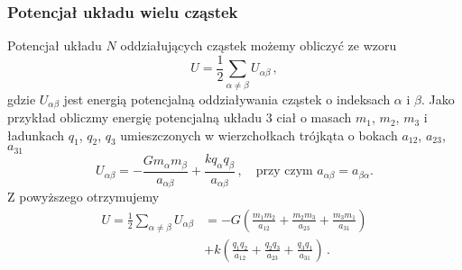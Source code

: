 \documentclass[../main.tex]{subfiles}
\begin{document}
\subsubsection{Potencjał układu wielu cząstek}
Potencjał układu \(N\) oddziałujących cząstek możemy obliczyć ze wzoru
\begin{equation*}
    U=\frac{1}{2}\sum_{\alpha\neq\beta}U_{\alpha\beta}\,,
\end{equation*}
gdzie \(U_{\alpha\beta}\) jest energią potencjalną oddziaływania cząstek o indeksach \(\alpha\) i
\(\beta\). Jako przykład obliczmy energię potencjalną układu 3 ciał o masach \(m_1\), \(m_2\),
\(m_3\) i ładunkach \(q_1\), \(q_2\), \(q_3\) umieszczonych w wierzchołkach trójkąta o bokach
\(a_{12}\), \(a_{23}\), \(a_{31}\)
\begin{equation*}
    U_{\alpha\beta}=-\frac{Gm_\alpha m_\beta}{a_{\alpha\beta}}+\frac{kq_\alpha q_\beta}{a_{\alpha\beta}}\,,\quad\text{przy czym \(a_{\alpha\beta}=a_{\beta\alpha}\).}
\end{equation*}
Z powyższego otrzymujemy
\begin{equation*}
\begin{split}
    U=\frac{1}{2}\sum_{\alpha\neq\beta}U_{\alpha\beta}&=-G\left(\frac{m_1m_2}{a_{12}}+\frac{m_2m_3}{a_{23}}+\frac{m_3m_1}{a_{31}}\right)\\
    &+k\left(\frac{q_1q_2}{a_{12}}+\frac{q_2q_3}{a_{23}}+\frac{q_3q_1}{a_{31}}\right)\,.
\end{split}
\end{equation*}
\end{document}
